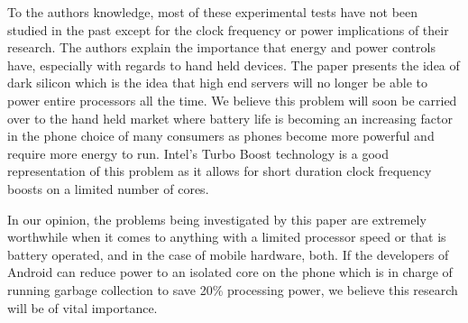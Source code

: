 \documentclass[conference]{IEEEtran}
\begin{document}
To the authors knowledge, most of these experimental tests have not been studied in the past
except for the clock frequency or power implications of their research. The authors explain
the importance that energy and power controls have, especially with regards to hand held devices.
The paper presents the idea of dark silicon which is the idea that high end servers will no longer
be able to power entire processors all the time. We believe this problem will soon be carried
over to the hand held market where battery life is becoming an increasing factor in the phone choice
of many consumers as phones become more powerful and require more energy to run. Intel's Turbo
Boost technology is a good representation of this problem as it allows for short duration 
clock frequency boosts on a limited number of cores.

In our opinion, the problems being investigated by this paper are extremely worthwhile when
it comes to anything with a limited processor speed or that is battery operated, and in the
case of mobile hardware, both. If the developers of Android can reduce power to an isolated
core on the phone which is in charge of running garbage collection to save 20\% processing
power, we believe this research will be of vital importance.




\balance



\end{document}
